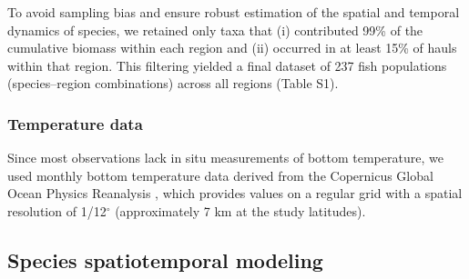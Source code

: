 \documentclass[11pt]{article}
\begin{document}
\begin{spacing}{1.5}
To avoid sampling bias and ensure robust estimation of the spatial and temporal dynamics of species, we retained only taxa that (i) contributed 99\% of the cumulative biomass within each region and (ii) occurred in at least 15\% of hauls within that region. This filtering yielded a final dataset of 237 fish populations (species–region combinations) across all regions (Table S1).


\subsubsection{Temperature data}

Since most observations lack in situ measurements of bottom temperature, we used monthly bottom temperature data derived from the Copernicus Global Ocean Physics Reanalysis \citep{european_union-copernicus_marine_service_global_2018}, which provides values on a regular grid with a spatial resolution of 1/12$^{\circ}$ (approximately 7 km at the study latitudes).


\subsection{Species spatiotemporal modeling}\label{sec:Species spatiotemporal modeling}


\end{spacing}
\end{document}
